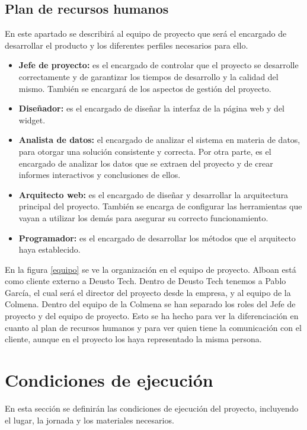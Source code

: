\subsection{Plan de recursos humanos}
En este apartado se describirá al equipo de proyecto que será el encargado de desarrollar el producto y los diferentes perfiles necesarios para ello.

\begin{itemize}
	\item \textbf{Jefe de proyecto:} es el encargado de controlar que el proyecto se desarrolle correctamente y de garantizar los tiempos de desarrollo y la calidad del mismo. También se encargará de los aspectos de gestión del proyecto.
	\item \textbf{Diseñador:} es el encargado de diseñar la interfaz de la página web y del widget.
	\item \textbf{Analista de datos:} el encargado de analizar el sistema en materia de datos, para otorgar una solución consistente y correcta. Por otra parte, es el encargado de analizar los datos que se extraen del proyecto y de crear informes interactivos y conclusiones de ellos.
	\item \textbf{Arquitecto web:} es el encargado de diseñar y desarrollar la arquitectura principal del proyecto. También se encarga de configurar las herramientas que vayan a utilizar los demás para asegurar su correcto funcionamiento.
	\item \textbf{Programador:} es el encargado de desarrollar los métodos que el arquitecto haya establecido.
\end{itemize}

En la figura \ref{equipo} se ve la organización en el equipo de proyecto. Alboan está como cliente externo a Deusto Tech. Dentro de Deusto Tech tenemos a Pablo García, el cual será el director del proyecto desde la empresa, y al equipo de la Colmena. Dentro del equipo de la Colmena se han separado los roles del Jefe de proyecto y del equipo de proyecto. Esto se ha hecho para ver la diferenciación en cuanto al plan de recursos humanos y para ver quien tiene la comunicación con el cliente, aunque en el proyecto los haya representado la misma persona.


\section{Condiciones de ejecución}
En esta sección se definirán las condiciones de ejecución del proyecto, incluyendo el lugar, la jornada y los materiales necesarios.

